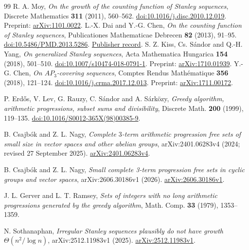 \documentclass[11pt]{article}
\theoremstyle{definition}\newtheorem{definition}[theorem]{Definition}
\theoremstyle{remark}\newtheorem{remark}[theorem]{Remark}
\numberwithin{equation}{section}
\begin{document}
\begin{thebibliography}{99}\small
{}
R. A. Moy, \emph{On the growth of the counting function of Stanley sequences}, Discrete Mathematics \textbf{311} (2011), 560--562. \href{https://doi.org/10.1016/j.disc.2010.12.019}{doi:10.1016/j.disc.2010.12.019}. Preprint: \href{https://arxiv.org/abs/1101.0022}{arXiv:1101.0022}.
L.-X. Dai and Y.-G. Chen, \emph{On the counting function of Stanley sequences}, Publicationes Mathematicae Debrecen \textbf{82} (2013), 91--95. \href{https://doi.org/10.5486/PMD.2013.5286}{doi:10.5486/PMD.2013.5286}.
\href{https://publi.math.unideb.hu/paper/1750}{Publisher record}.
S. Z. Kiss, Cs. S\'andor and Q.-H. Yang, \emph{On generalized Stanley sequences}, Acta Mathematica Hungarica \textbf{154} (2018), 501--510. \href{https://doi.org/10.1007/s10474-018-0791-1}{doi:10.1007/s10474-018-0791-1}. Preprint: \href{https://arxiv.org/abs/1710.01939}{arXiv:1710.01939}.
Y.-G. Chen, \emph{On $AP_3$-covering sequences}, Comptes Rendus Math\'ematique \textbf{356} (2018), 121--124. \href{https://doi.org/10.1016/j.crma.2017.12.013}{doi:10.1016/j.crma.2017.12.013}. Preprint: \href{https://arxiv.org/abs/1711.00172}{arXiv:1711.00172}.

P. Erd\H{o}s, V. Lev, G. Rauzy, C. S\'andor and A. S\'ark\"ozy,
\emph{Greedy algorithm, arithmetic progressions, subset sums and divisibility},
Discrete Math. \textbf{200} (1999), 119--135.
\href{https://doi.org/10.1016/S0012-365X(98)00385-9}{doi:10.1016/S0012-365X(98)00385-9}.

B. Csajb\'ok and Z. L. Nagy,
\emph{Complete $3$-term arithmetic progression free sets of small size in vector spaces and other abelian groups},
arXiv:2401.06283v4 (2024; revised 27 September 2025).
\href{https://arxiv.org/abs/2401.06283v4}{arXiv:2401.06283v4}.

B. Csajb\'ok and Z. L. Nagy,
\emph{Small complete 3-term progression free sets in cyclic groups and vector spaces},
arXiv:2606.30186v1 (2026).
\href{https://arxiv.org/abs/2606.30186v1}{arXiv:2606.30186v1}.

J. L. Gerver and L. T. Ramsey,
\emph{Sets of integers with no long arithmetic progressions generated by the greedy algorithm},
Math. Comp. \textbf{33} (1979), 1353--1359.

N. Sothanaphan,
\emph{Irregular Stanley sequences plausibly do not have growth $\Theta(n^2/\log n)$},
arXiv:2512.11983v1 (2025).
\href{https://arxiv.org/abs/2512.11983v1}{arXiv:2512.11983v1}.


\end{thebibliography}
\end{document}
